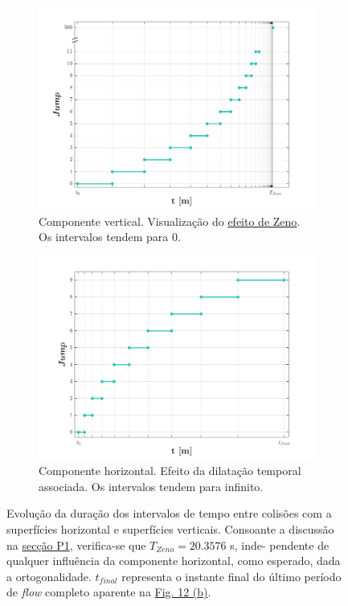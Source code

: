 \vspace{-1.85em}
\begin{figure}[H]
    \begin{subfigure}[b]{0.5\linewidth}
        \centering
        \includegraphics[width=1\linewidth]{img/P4/P4-zeno.png}
        \caption{Componente vertical. Visualização do \hyperref[def:zeno]{efeito de Zeno}. Os intervalos tendem para 0.} 
        \label{fig:P4-zeno} 
    \end{subfigure}%
    \begin{subfigure}[b]{0.5\linewidth}
        \centering
        \includegraphics[width=1\linewidth]{img/P4/P4-antizeno.png}
        \caption{Componente horizontal. Efeito da dilatação temporal associada. Os intervalos tendem para infinito.} 
        \label{fig:P4-antizeno} 
    \end{subfigure}%
    \caption{Evolução da duração dos intervalos de tempo entre colisões com a superfícies horizontal e superfícies verticais. Consoante a discussão na \hyperref[subsec:P1]{secção P1}, verifica-se que $T_{Zeno} =  20.3576$ s, inde- pendente de qualquer influência da componente horizontal, como esperado, dada a ortogonalidade. $t_{final}$ representa o instante final do último período de \textit{flow} completo aparente na \hyperref[fig:P4-y]{Fig. 12 (b)}.}
    \label{fig:P4-zenos}
\end{figure}
